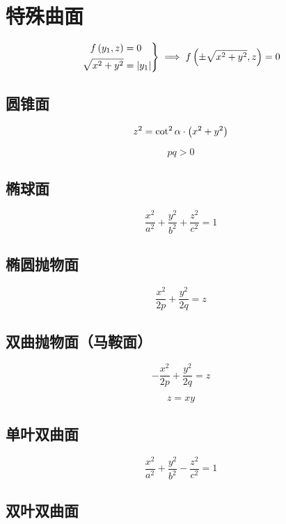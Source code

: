 \documentclass{article}
\begin{document}
\section{特殊曲面}

\begin{definition}[绕$z$轴旋转曲面：（原曲线为$f\p{y_1,z}=0$）]
    \[\left.\begin{aligned}
            f\left(y_1,z\right)     & =0         \\
            \sqrt{x^2+y^2} & =\left|y_1\right|
        \end{aligned}\right\}
        \implies
        f\left(\pm\sqrt{x^2+y^2},z\right)=0\]
\end{definition}

\subsection{圆锥面}

\[z^2=\cot^2\alpha\cdot\left(x^2+y^2\right)\]

\begin{definition}[以下二次曲面方程中都有]
    \[pq>0\]
\end{definition}

\subsection{椭球面}

\[\frac{x^2}{a^2}+\frac{y^2}{b^2}+\frac{z^2}{c^2}=1\]

\subsection{椭圆抛物面}

\[\frac{x^2}{2p}+\frac{y^2}{2q}=z\]

\subsection{双曲抛物面（马鞍面）}

\[-\frac{x^2}{2p}+\frac{y^2}{2q}=z\]

\[z=xy\]

\subsection{单叶双曲面}

\[\frac{x^2}{a^2}+\frac{y^2}{b^2}-\frac{z^2}{c^2}=1\]

\subsection{双叶双曲面}
\end{document}
